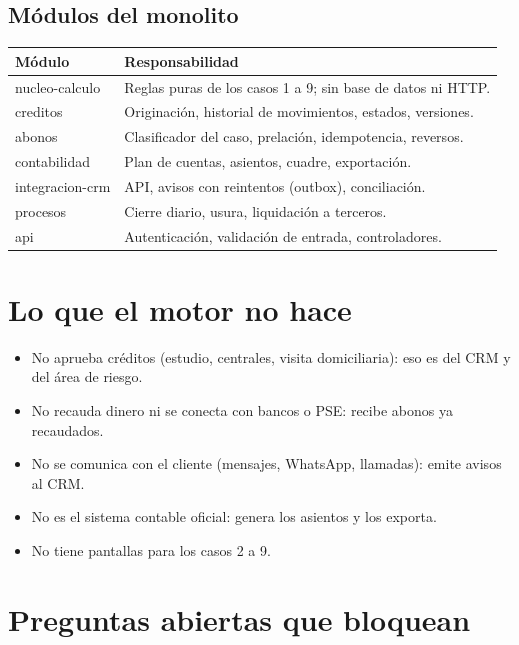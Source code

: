 \documentclass[11pt,a4paper]{article}
\begin{document}
\subsection*{Módulos del monolito}
\begin{tabularx}{\linewidth}{>{\ttfamily}l X}
\toprule
\normalfont\bfseries Módulo & \bfseries Responsabilidad \\
\midrule
nucleo-calculo & Reglas puras de los casos 1 a 9; sin base de datos ni HTTP. \\
creditos & Originación, historial de movimientos, estados, versiones. \\
abonos & Clasificador del caso, prelación, idempotencia, reversos. \\
contabilidad & Plan de cuentas, asientos, cuadre, exportación. \\
integracion-crm & API, avisos con reintentos (outbox), conciliación. \\
procesos & Cierre diario, usura, liquidación a terceros. \\
api & Autenticación, validación de entrada, controladores. \\
\bottomrule
\end{tabularx}

\section{Lo que el motor no hace}
\begin{itemize}
  \item No aprueba créditos (estudio, centrales, visita domiciliaria): eso es del CRM y del área de riesgo.
  \item No recauda dinero ni se conecta con bancos o PSE: recibe abonos ya recaudados.
  \item No se comunica con el cliente (mensajes, WhatsApp, llamadas): emite avisos al CRM.
  \item No es el sistema contable oficial: genera los asientos y los exporta.
  \item No tiene pantallas para los casos 2 a 9.
\end{itemize}

\section{Preguntas abiertas que bloquean}
\end{document}
